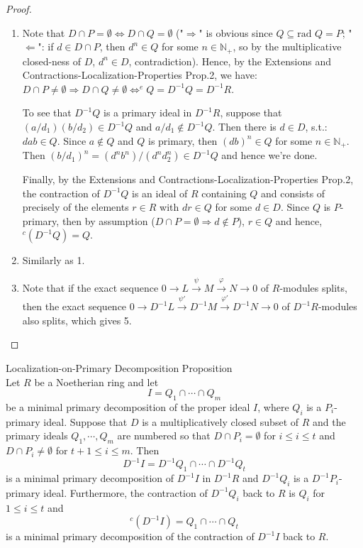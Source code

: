 \begin{proof}
\begin{enumerate}
        \item Note that $D\cap P=\emptyset \Leftrightarrow D\cap Q=\emptyset$ ("$\Rightarrow$" is obvious since $Q\subseteq \text{rad }Q=
        P$; "$\Leftarrow$": if $d\in D \cap P$, then $d^n \in Q$ for some $n\in \mathbb{N}_+$, so by the multiplicative closed-ness of $D$, $d^n \in D$, contradiction). Hence, by the Extensions and Contractions-Localization-Properties Prop.2, we have: $D\cap P\neq \emptyset \Rightarrow D \cap Q \neq \emptyset \Leftrightarrow ^eQ=D^{-1}Q=D^{-1}R$.

        To see that $D^{-1}Q$ is a primary ideal in $D^{-1}R$, suppose that $(a/d_1)(b/d_2) \in D^{-1}Q$ and $a/d_1 \notin D^{-1}Q$. Then there is $d\in D$, s.t.: $dab \in Q$. Since $a\notin Q$ and $Q$ is primary, then $(db)^n \in Q$ for some $n\in \mathbb{N}_+$. Then $(b/d_1)^n= (d^nb^n)/ (d^nd_2^n) \in D^{-1}Q$ and hence we're done.

        Finally, by the Extensions and Contractions-Localization-Properties Prop.2, the contraction of $D^{-1}Q$ is an ideal of $R$ containing $Q$ and consists of precisely of the elements $r\in R$ with $dr \in Q$ for some $d\in D$. Since $Q$ is $P$-primary, then by assumption ($D\cap P =\emptyset \Rightarrow d\notin P$), $r\in Q$ and hence, $^c(D^{-1}Q)=Q$.

        \item Similarly as 1.
        \item Note that if the exact sequence $0\to L \overset{\psi}{\to} M \overset{\varphi}{\to} N\to0$ of $R$-modules splits, then the exact sequence $0 \to D^{-1}L \overset{\psi'}{\to} D^{-1}M \overset{\varphi'}{\to} D^{-1}N \to0$ of $D^{-1}R$-modules also splits, which gives 5.
    \end{enumerate}
\end{proof}

\begin{proposition}{Localization-on-Primary Decomposition Proposition}\\
Let $R$ be a Noetherian ring and let
$$I= Q_1 \cap \cdots \cap Q_m$$
be a minimal primary decomposition of the proper ideal $I$, where $Q_i$ is a $P_i$-primary ideal. Suppose that $D$ is a multiplicatively closed subset of $R$ and the primary ideals $Q_1 ,\cdots, Q_m$ are numbered so that $D \cap P_i=\emptyset$ for $i\leq i\leq t$ and $D \cap P_i\neq \emptyset$ for $t+1 \leq i \leq m$. Then
$$D^{-1}I= D^{-1}Q_1 \cap \cdots \cap D^{-1} Q_t$$
is a minimal primary decomposition of $D^{-1}I$ in $D^{-1}R$ and $D^{-1}Q_i$ is a $D^{-1}P_i$-primary ideal. Furthermore, the contraction of $D^{-1}Q_i$ back to $R$ is $Q_i$ for $1\leq i\leq t$ and 
$$^c(D^{-1}I)= Q_1 \cap \cdots \cap Q_t$$
is a minimal primary decomposition of the contraction of $D^{-1}I$ back to $R$.
\end{proposition}

